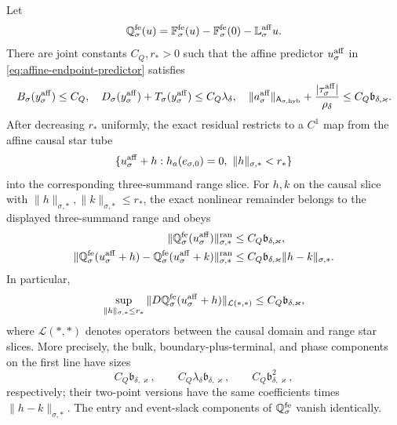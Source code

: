 \begin{theorem}
Let
\begin{equation}
 \mathbb Q_\sigma^{\rm fe}(u)
 =\mathbb F_\sigma^{\rm fe}(u)
   -\mathbb F_\sigma^{\rm fe}(0)
   -\mathbb L_\sigma^{\rm aff}u.                \label{eq:fixed-envelope-nonlinear-remainder}
\end{equation}
There are joint constants \(C_Q,r_*>0\) such that the affine predictor
\(u_\sigma^{\rm aff}\) in
\cref{eq:affine-endpoint-predictor} satisfies
\begin{equation}
 B_\sigma(y_\sigma^{\rm aff})\le C_Q,\quad
 D_\sigma(y_\sigma^{\rm aff})
      +T_\sigma(y_\sigma^{\rm aff})\le C_Q\lambda_\delta,\quad
 \|a_\sigma^{\rm aff}\|_{\mathsf A_{\sigma,\mathrm{hyb}}}
      +\frac{|\tau_\sigma^{\rm aff}|}{\rho_\delta}
 \le C_Q\mathfrak b_{\delta,\varkappa}.         \label{eq:fixed-envelope-affine-box}
\end{equation}
After decreasing \(r_*\) uniformly, the exact residual restricts to a
\(C^1\) map from the affine causal star tube
\[
 \{u_\sigma^{\rm aff}+h:
       h_a(e_{\sigma,0})=0,\ \|h\|_{\sigma,*}<r_*\}
\]
into the corresponding three-summand range slice.
For \(h,k\) on the causal slice with
\(\|h\|_{\sigma,*},\|k\|_{\sigma,*}\le r_*\),
the exact nonlinear remainder belongs to the displayed three-summand
range and obeys
\begin{align}
 \|\mathbb Q_\sigma^{\rm fe}(u_\sigma^{\rm aff})\|_
        {\sigma,*}^{\rm ran}
 &\le C_Q\mathfrak b_{\delta,\varkappa},\notag\\
 \|\mathbb Q_\sigma^{\rm fe}(u_\sigma^{\rm aff}+h)
       -\mathbb Q_\sigma^{\rm fe}(u_\sigma^{\rm aff}+k)\|_
        {\sigma,*}^{\rm ran}
 &\le C_Q\mathfrak b_{\delta,\varkappa}
       \|h-k\|_{\sigma,*}.                     \label{eq:fixed-envelope-star-two-point}
\end{align}
In particular,
\begin{equation}
 \sup_{\|h\|_{\sigma,*}\le r_*}
 \|D\mathbb Q_\sigma^{\rm fe}
       (u_\sigma^{\rm aff}+h)\|_{\mathcal L(*,*)}
 \le C_Q\mathfrak b_{\delta,\varkappa},         \label{eq:fixed-envelope-star-derivative}
\end{equation}
where \(\mathcal L(*,*)\) denotes operators between the causal domain and
range star slices.
More precisely, the bulk, boundary-plus-terminal, and phase components
on the first line have sizes
\begin{equation}
 C_Q\mathfrak b_{\delta,\varkappa},\qquad
 C_Q\lambda_\delta\mathfrak b_{\delta,\varkappa},\qquad
 C_Q\mathfrak b_{\delta,\varkappa}^2,           \label{eq:fixed-envelope-remainder-components}
\end{equation}
respectively; their two-point versions have the same coefficients times
\(\|h-k\|_{\sigma,*}\).  The entry and event-slack components of
\(\mathbb Q_\sigma^{\rm fe}\) vanish identically.


\end{theorem}
